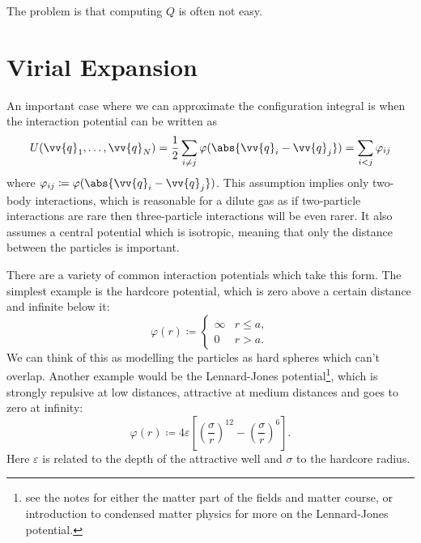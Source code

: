 \documentclass[fleqn]{NotesClass}
\begin{document}
    The problem is that computing \(Q\) is often not easy.
    
    \section{Virial Expansion}
    An important case where we can approximate the configuration integral is when the interaction potential can be written as
    \begin{equation}
        U(\vv{q}_1, \dotsc, \vv{q}_N)  = \frac{1}{2} \sum_{i \ne j} \varphi(\abs{\vv{q}_i - \vv{q}_j}) = \sum_{i < j} \varphi_{ij}
    \end{equation}
    where \(\varphi_{ij} \coloneqq \varphi(\abs{\vv{q}_i - \vv{q}_j})\).
    This assumption implies only two-body interactions, which is reasonable for a dilute gas as if two-particle interactions are rare then three-particle interactions will be even rarer.
    It also assumes a central potential which is isotropic, meaning that only the distance between the particles is important.
    
    There are a variety of common interaction potentials which take this form.
    The simplest example is the hardcore potential, which is zero above a certain distance and infinite below it:
    \begin{equation}
        \varphi(r) \coloneqq
        \begin{cases}
            \infty & r \le a,\\
            0 & r > a.
        \end{cases}
    \end{equation}
    We can think of this as modelling the particles as hard spheres which can't overlap.
    Another example would be the Lennard-Jones potential\footnote{see the notes for either the matter part of the fields and matter course, or introduction to condensed matter physics for more on the Lennard-Jones potential.}, which is strongly repulsive at low distances, attractive at medium distances and goes to zero at infinity:
    \begin{equation}
        \varphi(r) \coloneqq 4\varepsilon \left[ \left( \frac{\sigma}{r} \right)^{12} - \left( \frac{\sigma}{r} \right)^6 \right].
    \end{equation}
    Here \(\varepsilon\) is related to the depth of the attractive well and \(\sigma\) to the hardcore radius.
    
\end{document}
